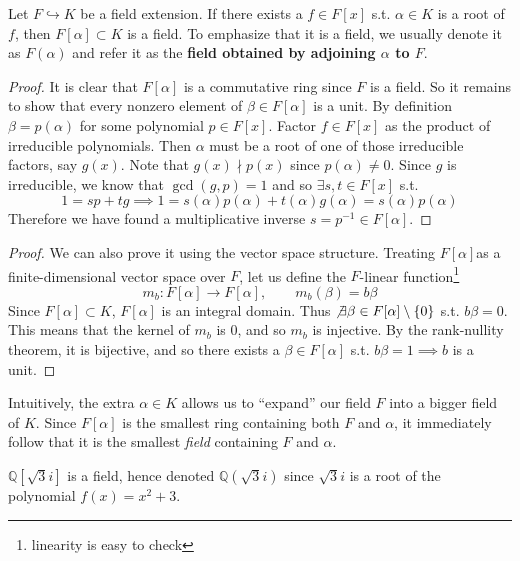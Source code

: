   \begin{theorem}
    Let $F \hookrightarrow K$ be a field extension. If there exists a $f \in F[x]$ s.t. $\alpha \in K$ is a root of $f$, then $F[\alpha] \subset K$ is a field. To emphasize that it is a field, we usually denote it as $F(\alpha)$ and refer it as the \textbf{field obtained by adjoining $\alpha$ to $F$}. 
  \end{theorem}
  \begin{proof}
    It is clear that $F[\alpha]$ is a commutative ring since $F$ is a field. So it remains to show that every nonzero element of $\beta \in F[\alpha]$ is a unit. By definition $\beta = p(\alpha)$ for some polynomial $p \in F[x]$.  Factor $f \in F[x]$ as the product of irreducible polynomials. Then $\alpha$ must be a root of one of those irreducible factors, say $g(x)$. Note that $g(x) \nmid p(x)$ since $p(\alpha) \neq 0$. Since $g$ is irreducible, we know that $\gcd(g, p) = 1$ and so $\exists s, t \in F[x]$ s.t. 
    \begin{equation}
      1 = s p + t g \implies 1 = s(\alpha) p(\alpha) + t(\alpha) g(\alpha) = s(\alpha) p(\alpha)
    \end{equation}  
    Therefore we have found a multiplicative inverse $s = p^{-1} \in F[\alpha]$. 
  \end{proof} 
  \begin{proof}
    We can also prove it using the vector space structure. Treating $F[\alpha]$as a finite-dimensional vector space over $F$, let us define the $F$-linear function\footnote{linearity is easy to check}
    \begin{equation}
      m_b: F[\alpha] \rightarrow F[\alpha], \qquad m_b (\beta) = b\beta
    \end{equation} 
    Since $F[\alpha] \subset K$, $F[\alpha]$ is an integral domain. Thus $\not\exists \beta \in F[\alpha] \setminus \{0\}$ s.t. $b \beta = 0$. This means that the kernel of $m_b$ is $0$, and so $m_b$ is injective. By the rank-nullity theorem, it is bijective, and so there exists a $\beta \in F[\alpha]$ s.t. $b \beta = 1 \implies b$ is a unit. 
  \end{proof}

  Intuitively, the extra $\alpha \in K$ allows us to ``expand'' our field $F$ into a bigger field of $K$. Since $F[\alpha]$ is the smallest ring containing both $F$ and $\alpha$, it immediately follow that it is the smallest \textit{field} containing $F$ and $\alpha$. 

  \begin{example}
    $\mathbb{Q}[\sqrt{3} i]$ is a field, hence denoted $\mathbb{Q}(\sqrt{3} i)$ since $\sqrt{3}i$ is a root of the polynomial $f(x) = x^2 + 3$. 
  \end{example}

